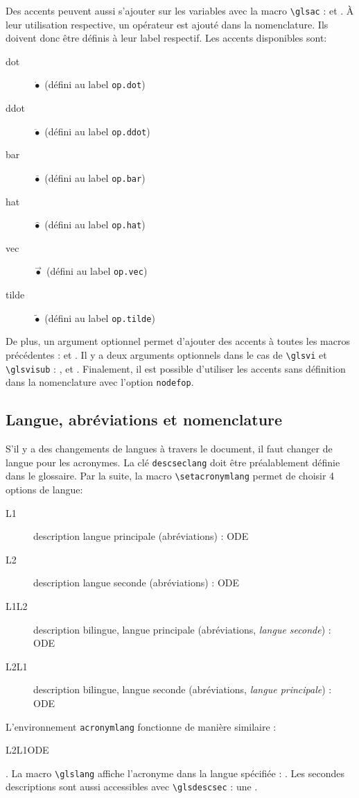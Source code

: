 \documentclass[projet,nohyperref,english,french]{ulthese}
\begin{document}
Des accents peuvent aussi s'ajouter sur les variables avec la macro \texttt{\textbackslash glsac} :  et . À leur utilisation respective, un opérateur est ajouté dans la nomenclature. Ils doivent donc être définis à leur label respectif. Les accents disponibles sont:
\begin{description} 
\item[dot] $\dot{\bullet}$ (défini au label \texttt{op.dot})
\item[ddot] $\ddot{\bullet}$ (défini au label \texttt{op.ddot})
\item[bar] $\bar{\bullet}$ (défini au label \texttt{op.bar})
\item[hat] $\widehat{\bullet}$ (défini au label \texttt{op.hat})
\item[vec] $\vec{\bullet}$ (défini au label \texttt{op.vec})
\item[tilde] $\widetilde{\bullet}$ (défini au label \texttt{op.tilde})
\end{description}
De plus, un argument optionnel permet d'ajouter des accents à toutes les macros précédentes :  et . Il y a deux arguments optionnels dans le cas de \texttt{\textbackslash glsvi} et \texttt{\textbackslash glsvisub} : ,  et . Finalement, il est possible d'utiliser les accents sans définition dans la nomenclature avec l'option \texttt{nodefop}.

\subsection{Langue, abréviations et nomenclature}

S'il y a des changements de langues à travers le document, il faut changer de langue pour les acronymes. La clé \texttt{descseclang} doit être préalablement définie dans le glossaire. Par la suite, la macro \texttt{\textbackslash setacronymlang} permet de choisir 4 options de langue: 
\begin{description}
	\item[L1] description langue principale (abréviations) : \acrfull{ODE}
	\item[L2] description langue seconde (abréviations) : \acrfull{ODE}
	\item[L1L2] description bilingue, langue principale (abréviations, \textit{langue seconde}) : \acrfull{ODE}
	\item[L2L1] description bilingue, langue seconde (abréviations, \textit{langue principale}) : \acrfull{ODE}
\end{description}
L'environnement \texttt{acronymlang} fonctionne de manière similaire : \begin{acronymlang}{L2L1}\acrfull{ODE}\end{acronymlang}. La macro \texttt{\textbackslash glslang} affiche l'acronyme dans la langue spécifiée : . Les secondes descriptions sont aussi accessibles avec \texttt{\textbackslash glsdescsec} : une .
\end{document}
